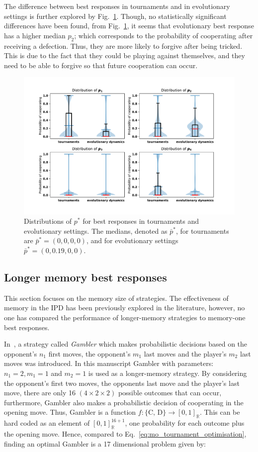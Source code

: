 \documentclass[10pt]{article}
\newcommand{\R}{\mathbb{R}}
\begin{document}
The difference between best responses in tournaments and in evolutionary
settings is further explored by Fig.~\ref{fig:behaviour_violin_plots}.
Though, no statistically significant differences have been found, from
Fig.~\ref{fig:behaviour_violin_plots}, it seems that evolutionary best
response has a higher median $p_2$; which corresponds to the probability of cooperating
after receiving a defection. Thus, they are more likely to forgive after
being tricked. This is due to the fact that they could be playing against
themselves, and they need to be able to forgive so that future cooperation can
occur.

\begin{figure}[!htbp]
    \centering
    \includegraphics[width=.55\textwidth]{img/behaviour_violin_plots.pdf}
    \caption{Distributions of \(p^*\) for best responses in tournaments and
    evolutionary settings. The medians, denoted as \(\bar{p}^*\), for tournaments
    are \(\bar{p}^* = (0, 0, 0, 0)\), and for evolutionary settings
    \(\bar{p}^* = (0, 0.19, 0, 0)\).}
    \label{fig:behaviour_violin_plots}
\end{figure}

\subsection{Longer memory best responses}

This section focuses on the memory size of strategies. The effectiveness of
memory in the IPD has been previously explored in the literature, however, no one
has compared the performance of longer-memory
strategies to memory-one best responses.

In~\cite{Harper2017}, a strategy called \textit{Gambler} which makes
probabilistic decisions based on the opponent's \(n_1\) first moves, the
opponent's \(m_1\) last moves and the player's \(m_2\) last moves was
introduced. In this manuscript Gambler with parameters: $n_1 = 2, m_1 = 1$ and $m_2 = 1$ is used
as a longer-memory strategy.
By considering the opponent's first two moves, the opponents last move and the
player's last move, there are only 16 $(4 \times 2 \times 2)$ possible outcomes
that can occur, furthermore, Gambler also makes a probabilistic decision of
cooperating in the opening move. Thus, Gambler is a function \(f: \{\text{C,
D}\} \rightarrow [0, 1]_{\R}\). This can be hard coded as an element
of \([0, 1]_{\R} ^ {16 + 1}\), one probability for each outcome plus the opening
move. Hence, compared to Eq.~\ref{eq:mo_tournament_optimisation}, finding an
optimal Gambler is a 17 dimensional problem given by:
\end{document}
